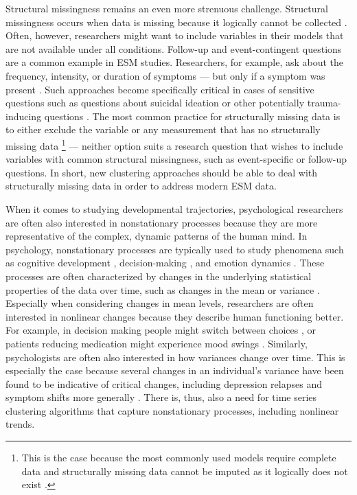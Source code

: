 \documentclass[man, 12pt, a4paper, floatsintext]{apa7}
\theoremstyle{break}
\theoremstyle{plain}
\begin{document}
Structural missingness remains an even more strenuous challenge. Structural missingness occurs when data is missing because it logically cannot be collected \citep[as opposed to probabilistically missing data;][]{little2020, mclean2017}. Often, however, researchers might want to include variables in their models that are not available under all conditions. Follow-up and event-contingent questions are a common example in ESM studies. Researchers, for example, ask about the frequency, intensity, or duration of symptoms --- but only if a symptom was present \citep{kivela2022}. Such approaches become specifically critical in cases of sensitive questions such as questions about suicidal ideation or other potentially trauma-inducing questions \citep[e.g.,][]{glenn2022}. The most common practice for structurally missing data is to either exclude the variable or any measurement that has no structurally missing data \citep[e.g.,][]{lavori2008}\footnote{This is the case because the most commonly used models require complete data \citep{schafer2002} and structurally missing data cannot be imputed as it logically does not exist \citep[e.g.,][]{lavori2008}.} --- neither option suits a research question that wishes to include variables with common structural missingness, such as event-specific or follow-up questions. In short, new clustering approaches should be able to deal with structurally missing data in order to address modern ESM data.

When it comes to studying developmental trajectories, psychological researchers are often also interested in nonstationary processes because they are more representative of the complex, dynamic patterns of the human mind. In psychology, nonstationary processes are typically used to study phenomena such as cognitive development \citep[][]{quartz1997}, decision-making \citep[][]{ratcliff2016}, and emotion dynamics \citep[][]{bringmann2018b}. These processes are often characterized by changes in the underlying statistical properties of the data over time, such as changes in the mean or variance \citep[][]{molenaar2009}. Especially when considering changes in mean levels, researchers are often interested in nonlinear changes because they describe human functioning better. For example, in decision making people might switch between choices \citep[][]{ratcliff2016}, or patients reducing medication might experience mood swings \citep[][]{helmich2020a}. Similarly, psychologists are often also interested in how variances change over time. This is especially the case because several changes in an individual's variance have been found to be indicative of critical changes, including depression relapses and symptom shifts more generally \citep[e.g.,][]{schreuder2020, wichers2020}. There is, thus, also a need for time series clustering algorithms that capture nonstationary processes, including nonlinear trends.
\end{document}
